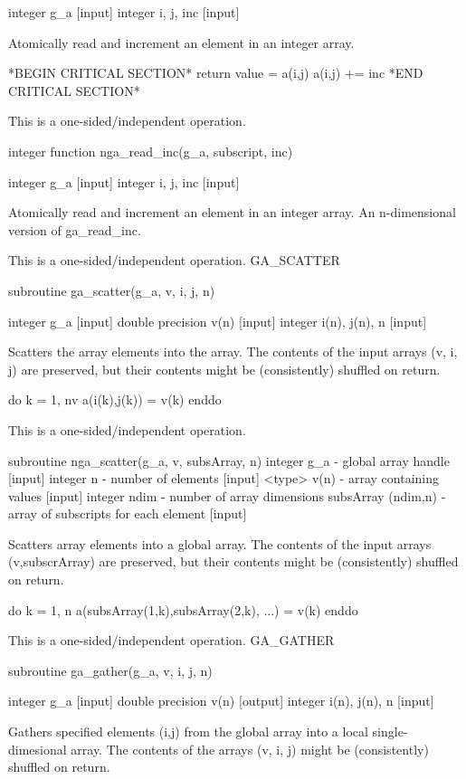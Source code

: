 integer g\_a {[}input{]} integer i, j, inc {[}input{]}

Atomically read and increment an element in an integer array.

{*}BEGIN CRITICAL SECTION{*} return value = a(i,j) a(i,j) += inc {*}END
CRITICAL SECTION{*}

This is a one-sided/independent operation.

integer function nga\_read\_inc(g\_a, subscript, inc)

integer g\_a {[}input{]} integer i, j, inc {[}input{]}

Atomically read and increment an element in an integer array. An n-dimensional
version of ga\_read\_inc.

This is a one-sided/independent operation. GA\_SCATTER

subroutine ga\_scatter(g\_a, v, i, j, n)

integer g\_a {[}input{]} double precision v(n) {[}input{]} integer
i(n), j(n), n {[}input{]}

Scatters the array elements into the array. The contents of the input
arrays (v, i, j) are preserved, but their contents might be (consistently)
shuffled on return.

do k = 1, nv a(i(k),j(k)) = v(k) enddo

This is a one-sided/independent operation.

subroutine nga\_scatter(g\_a, v, subsArray, n) integer g\_a - global
array handle {[}input{]} integer n - number of elements {[}input{]}
<type> v(n) - array containing values {[}input{]} integer ndim - number
of array dimensions subsArray (ndim,n) - array of subscripts for each
element {[}input{]}

Scatters array elements into a global array. The contents of the input
arrays (v,subscrArray) are preserved, but their contents might be
(consistently) shuffled on return.

do k = 1, n a(subsArray(1,k),subsArray(2,k), ...) = v(k) enddo

This is a one-sided/independent operation. GA\_GATHER

subroutine ga\_gather(g\_a, v, i, j, n)

integer g\_a {[}input{]} double precision v(n) {[}output{]} integer
i(n), j(n), n {[}input{]}

Gathers specified elements (i,j) from the global array into a local
single-dimesional array. The contents of the arrays (v, i, j) might
be (consistently) shuffled on return.

